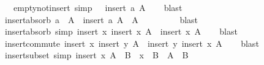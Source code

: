 \begin{isabellebody}
\ \ \ empty{\isacharunderscore}{\kern0pt}not{\isacharunderscore}{\kern0pt}insert\ {\isacharbrackleft}{\kern0pt}simp{\isacharbrackright}{\kern0pt}{\isacharcolon}{\kern0pt}\ {\isachardoublequoteopen}{\isacharbraceleft}{\kern0pt}{\isacharbraceright}{\kern0pt}\ {\isasymnoteq}\ insert\ a\ A{\isachardoublequoteclose}\isanewline
%
\isadelimproof
\ \ %
\endisadelimproof
%
\isatagproof
{}\isamarkupfalse%
\ blast{\isacharplus}{\kern0pt}%
\endisatagproof
{\isafoldproof}%
%
\isadelimproof
\isanewline
%
\endisadelimproof
\isanewline
{}\isamarkupfalse%
\ insert{\isacharunderscore}{\kern0pt}absorb{\isacharcolon}{\kern0pt}\ {\isachardoublequoteopen}a\ {\isasymin}\ A\ {\isasymLongrightarrow}\ insert\ a\ A\ {\isacharequal}{\kern0pt}\ A{\isachardoublequoteclose}\isanewline
\ \ %
\isanewline
\ \ %
\isanewline
%
\isadelimproof
\ \ %
\endisadelimproof
%
\isatagproof
{}\isamarkupfalse%
\ blast%
\endisatagproof
{\isafoldproof}%
%
\isadelimproof
\isanewline
%
\endisadelimproof
\isanewline
{}\isamarkupfalse%
\ insert{\isacharunderscore}{\kern0pt}absorb{}\ {\isacharbrackleft}{\kern0pt}simp{\isacharbrackright}{\kern0pt}{\isacharcolon}{\kern0pt}\ {\isachardoublequoteopen}insert\ x\ {\isacharparenleft}{\kern0pt}insert\ x\ A{\isacharparenright}{\kern0pt}\ {\isacharequal}{\kern0pt}\ insert\ x\ A{\isachardoublequoteclose}\isanewline
%
\isadelimproof
\ \ %
\endisadelimproof
%
\isatagproof
{}\isamarkupfalse%
\ blast%
\endisatagproof
{\isafoldproof}%
%
\isadelimproof
\isanewline
%
\endisadelimproof
\isanewline
{}\isamarkupfalse%
\ insert{\isacharunderscore}{\kern0pt}commute{\isacharcolon}{\kern0pt}\ {\isachardoublequoteopen}insert\ x\ {\isacharparenleft}{\kern0pt}insert\ y\ A{\isacharparenright}{\kern0pt}\ {\isacharequal}{\kern0pt}\ insert\ y\ {\isacharparenleft}{\kern0pt}insert\ x\ A{\isacharparenright}{\kern0pt}{\isachardoublequoteclose}\isanewline
%
\isadelimproof
\ \ %
\endisadelimproof
%
\isatagproof
{}\isamarkupfalse%
\ blast%
\endisatagproof
{\isafoldproof}%
%
\isadelimproof
\isanewline
%
\endisadelimproof
\isanewline
{}\isamarkupfalse%
\ insert{\isacharunderscore}{\kern0pt}subset\ {\isacharbrackleft}{\kern0pt}simp{\isacharbrackright}{\kern0pt}{\isacharcolon}{\kern0pt}\ {\isachardoublequoteopen}insert\ x\ A\ {\isasymsubseteq}\ B\ {\isasymlongleftrightarrow}\ x\ {\isasymin}\ B\ {\isasymand}\ A\ {\isasymsubseteq}\ B{\isachardoublequoteclose}\isanewline

\end{isabellebody}
